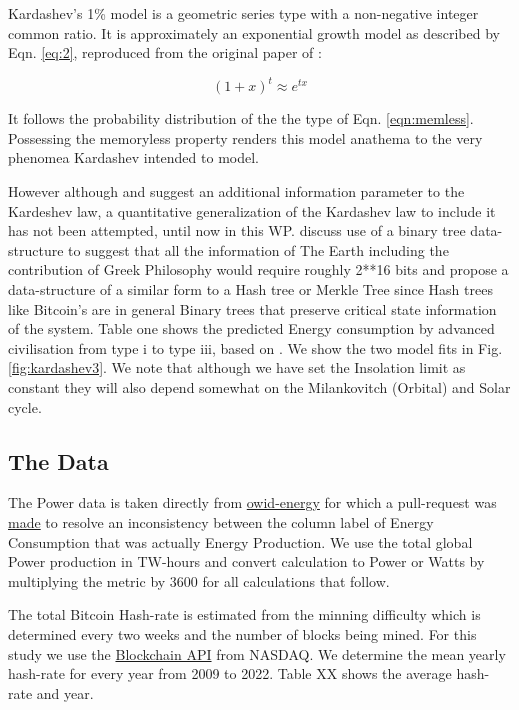 \documentclass[final,5p,times,twocolumn,authoryear]{elsarticle}
\begin{document}
Kardashev's 1\% model is a geometric series type with a non-negative integer common ratio. It is approximately an exponential growth model as described by Eqn. \ref{eq:2}, reproduced from the original paper of \cite{kar64}:

\begin{equation}
(1+x)^t \approx e^{tx}
\label{eq:2}
\end{equation}

It follows the probability distribution of the the type of Eqn. \ref{eqn:memless}. Possessing the memoryless property renders this model anathema to the very phenomea Kardashev intended to model.

 However although \cite{sagan73} and \cite{kar64} suggest an additional information parameter to the Kardeshev law, a quantitative generalization of the Kardashev law to include it has not been attempted, until now in this WP.  \cite{sagan73} discuss use of a binary tree data-structure to suggest that all the information of The Earth including the contribution of Greek Philosophy would require roughly 2**16 bits and propose a data-structure of a similar form to a Hash tree or Merkle Tree since Hash trees like Bitcoin's are in general Binary trees that preserve critical state information of the system. Table one shows the predicted Energy consumption by advanced civilisation from type i to type iii, based on \cite{kar64}. We show the two model fits in Fig. \ref{fig:kardashev3}. We note that although we have set the Insolation limit as constant they will also depend somewhat on the Milankovitch (Orbital) and Solar cycle. 

\subsection{The Data}
\label{subsec: data}

The Power data is taken directly from \href{https://github.com/owid/energy-data}{owid-energy} for which a pull-request was \href{https://github.com/owid/energy-data/pull/23}{made} to resolve an inconsistency between the column label of Energy Consumption that was actually Energy Production. We use the total global Power production in TW-hours and convert calculation to Power or Watts by multiplying the metric by 3600 for all calculations that follow.

The total Bitcoin Hash-rate is estimated from the minning difficulty which is determined every two weeks and the number of blocks being mined. For this study we use the \href{https://data.nasdaq.com/data/BCHAIN/HRATE-bitcoin-hash-rate}{Blockchain API} from NASDAQ. We determine the mean yearly hash-rate for every year from 2009 to 2022. Table XX shows the average hash-rate and year. 
\end{document}
